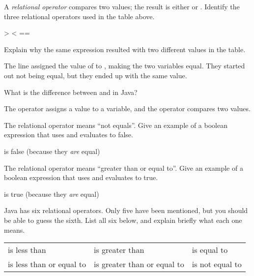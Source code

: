 
\Q A \emph{relational operator} compares two values; the result is either  or .
Identify the three relational operators used in the table above.

\begin{answer}[2em]
\begin{javaans}
    >    <    ==
\end{javaans}
\end{answer}


\Q Explain why the same expression  resulted with two different values in the table.

\begin{answer}
The line  assigned the value of  to , making the two variables equal.
They started out not being equal, but they ended up with the same value.
\end{answer}


\Q What is the difference between \java{=} and \java{==} in Java?

\begin{answer}
The \java{=} operator assigns a value to a variable, and the \java{==} operator compares two values.
\end{answer}


\Q The \java{!=} relational operator means ``not equals''.
Give an example of a boolean expression that uses \java{!=} and evaluates to false.

\begin{answer}[2em]
 is false (because they {\it are} equal)
\end{answer}


\Q The \java{>=} relational operator means ``greater than or equal to''.
Give an example of a boolean expression that uses \java{>=} and evaluates to true.

\begin{answer}[2em]
 is true (because they {\it are} equal)
\end{answer}


\Q Java has six relational operators.
Only five have been mentioned, but you should be able to guess the sixth.
List all six below, and explain briefly what each one means.

\begin{answer}
\begin{tabular}{lll}
\java{<} is less than              & \java{>} is greater than              & \java{==} is equal to     \\
\java{<=} is less than or equal to & \java{>=} is greater than or equal to & \java{!=} is not equal to \\
\end{tabular}
\end{answer}
